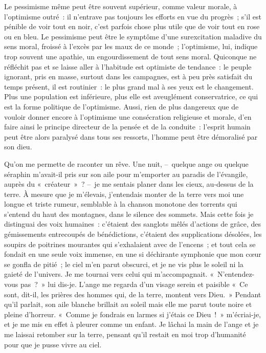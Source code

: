\documentclass[french,twoside]{book} %
\begin{document}
Le pessimisme même peut être souvent supérieur, comme valeur morale, à l’optimisme outré : il n’entrave pas toujours les efforts en vue du progrès ; s’il est pénible de voir tout en noir, c’est parfois chose plus utile que de voir tout en rose ou en bleu. Le pessimisme peut être le symptôme d’une surexcitation maladive du sens moral, froissé à l’excès par les maux de ce monde ; l’optimisme, lui, indique trop souvent une apathie, un engourdissement de tout sens moral. Quiconque ne réfléchit pas et se laisse aller à l’habitude est optimiste de tendance : le peuple ignorant, pris en masse, surtout dans les campagnes, est à peu près satisfait du temps présent, il est routinier : le plus grand mal à ses yeux est le changement. Plus une population est inférieure, plus elle est aveuglément conservatrice, ce qui est la forme politique de l’optimisme. Aussi, rien de plus dangereux que de vouloir donner encore à l’optimisme une consécration religieuse et morale, d’en faire ainsi le principe directeur de la pensée et de la conduite : l’esprit humain peut être alors paralysé dans tous ses ressorts, l’homme peut être démoralisé par son dieu.\par
Qu’on me permette de raconter un rêve. Une nuit, – quelque ange ou quelque séraphin m’avait-il pris sur son aile pour m’emporter au paradis de l’évangile, auprès du « créateur » ? – je me sentais planer dans les cieux, au-dessus de la terre. À mesure que je m’élevais, j’entendais monter de la terre vers moi une longue et triste rumeur, semblable à la chanson monotone des torrents qui s’entend du haut des montagnes, dans le silence des sommets. Mais cette fois je distinguai des voix humaines : c’étaient des sanglots mêlés d’actions de grâce, des gémissements entrecoupés de bénédictions, c’étaient des supplications désolées, les soupirs de poitrines mourantes qui s’exhalaient avec de l’encens ; et tout cela se fondait en une seule voix immense, en une si déchirante symphonie que mon cœur se gonfla de pitié ; le ciel m’en parut obscurci, et je ne vis plus le soleil ni la gaieté de l’univers. Je me tournai vers celui qui m’accompagnait. « N’entendez-vous pas ? » lui dis-je. L’ange me regarda d’un visage serein et paisible « Ce sont, dit-il, les prières des hommes qui, de la terre, montent vers Dieu. » Pendant qu’il parlait, son aile blanche brillait au soleil mais elle me parut toute noire et pleine d’horreur. « Comme je fondrais en larmes si j’étais ce Dieu ! » m’écriai-je, et je me mis en effet à pleurer comme un enfant. Je lâchai la main de l’ange et je me laissai retomber sur la terre, pensant qu’il restait en moi trop d’humanité pour que je pusse vivre au ciel.\par
\end{document}
